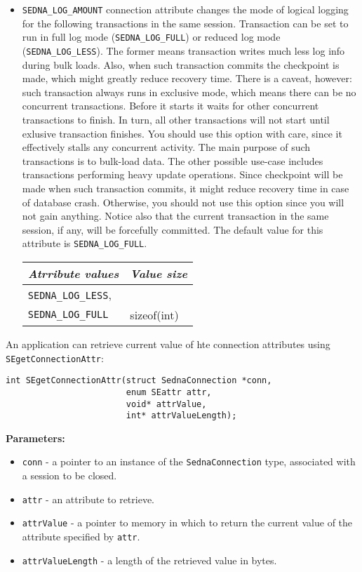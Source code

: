 \documentclass[a4paper,12pt]{article}
\newenvironment{citemize}
{\begin{itemize}
  \setlength{\itemsep}{0pt}
  \setlength{\parskip}{0pt}
  \setlength{\parsep}{0pt}}
{\end{itemize}}
\begin{document}
\begin{itemize}
\item\verb!SEDNA_LOG_AMOUNT! connection attribute changes the mode of logical
logging for the following transactions in the same session. Transaction can be
set to run in full log mode (\verb!SEDNA_LOG_FULL!) or reduced log mode
(\verb!SEDNA_LOG_LESS!). The former means transaction writes much less log info
during bulk loads. Also, when such transaction commits the checkpoint is made,
which might greatly reduce recovery time. There is a caveat, however: such
transaction always runs in exclusive mode, which means there can be no
concurrent transactions. Before it starts it waits for other concurrent
transactions to finish. In turn, all other transactions will not start until
exlusive transaction finishes. You should use this option with care, since it
effectively stalls any concurrent activity. The main purpose of such
transactions is to bulk-load data. The other possible use-case includes
transactions performing heavy update operations. Since checkpoint will be made
when such transaction commits, it might reduce recovery time in case of database
crash. Otherwise, you should not use this option since you will not gain
anything. Notice also that the current transaction in the same session, if any,
will be forcefully committed. The default value for this attribute is
\verb!SEDNA_LOG_FULL!.

\begin{tabular}{|l|l|}
\hline
\emph{Atrribute values} & \emph{Value size} \\
\hline
\verb!SEDNA_LOG_LESS!, & \\
\verb!SEDNA_LOG_FULL! & sizeof(int) \\
\hline
\end{tabular}
\end{itemize}

An application can retrieve current value of hte connection attributes using
\verb!SEgetConnectionAttr!:

\begin{verbatim}
int SEgetConnectionAttr(struct SednaConnection *conn,
                        enum SEattr attr,
                        void* attrValue,
                        int* attrValueLength);
\end{verbatim}

\noindent
\textbf{Parameters:}

\begin{citemize}
\item\verb!conn! - a pointer to an instance of the \verb!SednaConnection! type,
associated with a session to be closed.
\item\verb!attr! - an attribute to retrieve.
\item\verb!attrValue! - a pointer to memory in which to return the current value
of the attribute specified by \verb!attr!.
\item\verb!attrValueLength! - a length of the retrieved value in bytes.
\end{citemize}
\end{document}
